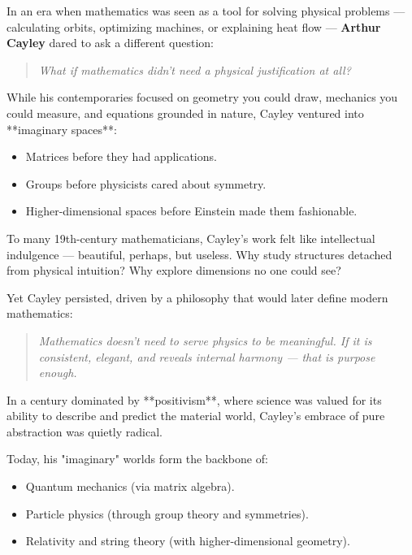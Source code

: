 \begin{tcolorbox}[colback=gray!5!white, colframe=gray!50!black, title={Historical Sidebar: Cayley — The Abstract Rebel in a Practical Age}, breakable]

    In an era when mathematics was seen as a tool for solving physical problems — calculating orbits, optimizing machines, or explaining heat flow — \textbf{Arthur Cayley} dared to ask a different question:
    
    \begin{quote}
    \textit{What if mathematics didn’t need a physical justification at all?}
    \end{quote}
    
    While his contemporaries focused on geometry you could draw, mechanics you could measure, and equations grounded in nature, Cayley ventured into **imaginary spaces**:
    
    \begin{itemize}
      \item Matrices before they had applications.
      \item Groups before physicists cared about symmetry.
      \item Higher-dimensional spaces before Einstein made them fashionable.
    \end{itemize}
    
    To many 19th-century mathematicians, Cayley’s work felt like intellectual indulgence — beautiful, perhaps, but useless. Why study structures detached from physical intuition? Why explore dimensions no one could see?
    
    Yet Cayley persisted, driven by a philosophy that would later define modern mathematics:
    
    \begin{quote}
    \textit{Mathematics doesn’t need to serve physics to be meaningful.  
    If it is consistent, elegant, and reveals internal harmony — that is purpose enough.}
    \end{quote}
    
    In a century dominated by **positivism**, where science was valued for its ability to describe and predict the material world, Cayley’s embrace of pure abstraction was quietly radical.
    
    \medskip
    
    Today, his "imaginary" worlds form the backbone of:
    
    \begin{itemize}
      \item Quantum mechanics (via matrix algebra).
      \item Particle physics (through group theory and symmetries).
      \item Relativity and string theory (with higher-dimensional geometry).
    \end{itemize}
    

\end{tcolorbox}
